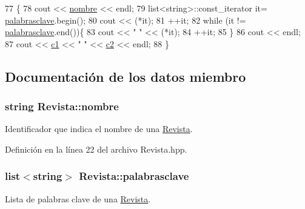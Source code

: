 \begin{DoxyCode}
77                                     \{
78     cout << \hyperlink{class_revista_a8f33fc429436702dc5bdd6abff4ec9ac}{nombre} << endl;
79     list<string>::const\_iterator it= \hyperlink{class_revista_ad149f8b2c389babf03d75a1347b1c56a}{palabrasclave}.begin();
80     cout << (*it);
81     ++it;
82     \textcolor{keywordflow}{while} (it != \hyperlink{class_revista_ad149f8b2c389babf03d75a1347b1c56a}{palabrasclave}.end())\{
83   cout << \textcolor{stringliteral}{" "} << (*it);
84   ++it;
85     \}
86     cout << endl;
87     cout << \hyperlink{class_revista_ae4142bc39207ffc39691c5a88d0c9162}{c1} << \textcolor{stringliteral}{" "} << \hyperlink{class_revista_a55e1411b360476402d364c0b956d7fc6}{c2} << endl;
88 \}\end{DoxyCode}


\subsection{Documentación de los datos miembro}
\hypertarget{class_revista_a8f33fc429436702dc5bdd6abff4ec9ac}{
\subsubsection[{nombre}]{\setlength{\rightskip}{0pt plus 5cm}string Revista\-::nombre\hspace{0.3cm}{\ttfamily [private]}}}\label{class_revista_a8f33fc429436702dc5bdd6abff4ec9ac}


Identificador que indica el nombre de una \hyperlink{class_revista}{Revista}. 



Definición en la línea 22 del archivo Revista.\-hpp.

\hypertarget{class_revista_ad149f8b2c389babf03d75a1347b1c56a}{
\subsubsection[{palabrasclave}]{\setlength{\rightskip}{0pt plus 5cm}list$<$string$>$ Revista\-::palabrasclave\hspace{0.3cm}{\ttfamily [private]}}}\label{class_revista_ad149f8b2c389babf03d75a1347b1c56a}


Lista de palabras clave de una \hyperlink{class_revista}{Revista}. 

